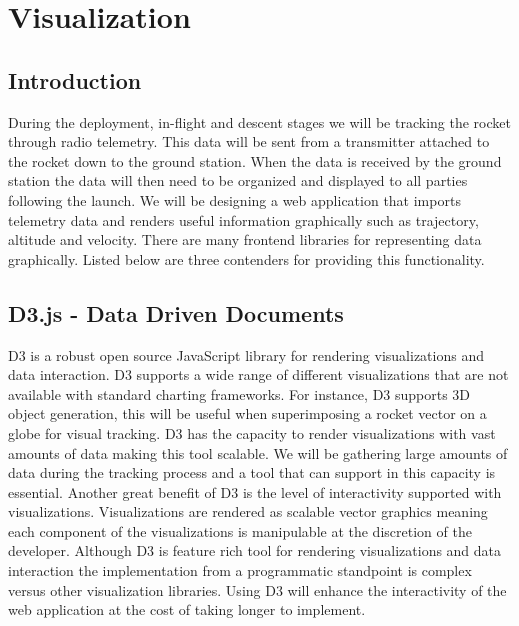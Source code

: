 \documentclass[onecolumn, draftclsnofoot,10pt, compsoc]{IEEEtran}
\begin{document}
\section{Visualization}
\subsection{Introduction}
During the deployment, in-flight and descent stages we will be tracking the rocket through radio telemetry. This data will be sent from a transmitter attached to the rocket down to the ground station. When the data is received by the ground station the data will then need to be organized and displayed to all parties following the launch. We will be designing a web application that imports telemetry data and renders useful information graphically such as trajectory, altitude and velocity. There are many frontend libraries for representing data graphically. Listed below are three contenders for providing this functionality. 
\subsection{D3.js - Data Driven Documents}
D3 is a robust open source JavaScript library for rendering visualizations and data interaction. D3 supports a wide range of different visualizations that are not available with standard charting frameworks. For instance, D3 supports 3D object generation, this will be useful when superimposing a rocket vector on a globe for visual tracking. D3 has the capacity to render visualizations with vast amounts of data making this tool scalable. We will be gathering large amounts of data during the tracking process and a tool that can support in this capacity is essential. Another great benefit of D3 is the level of interactivity supported with visualizations. Visualizations are rendered as scalable vector graphics meaning each component of the visualizations is manipulable at the discretion of the developer. Although D3 is feature rich tool for rendering visualizations and data interaction the implementation from a programmatic standpoint is complex versus other visualization libraries. Using D3 will enhance the interactivity  of the web application at the cost of taking longer to implement. 
\end{document}
